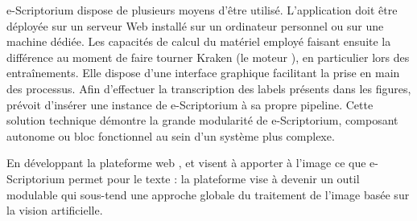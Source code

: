 e-Scriptorium dispose de plusieurs moyens d'être utilisé. L'application doit être déployée sur un serveur Web installé sur un ordinateur personnel ou sur une machine dédiée. Les capacités de calcul du matériel employé faisant ensuite la différence au moment de faire tourner Kraken (le moteur \htr), en particulier lors des entraînements. Elle dispose d'une interface graphique facilitant la prise en main des processus. Afin d'effectuer la transcription des labels présents dans les figures, \eida prévoit d'insérer une instance de e-Scriptorium à sa propre pipeline. Cette solution technique démontre la grande modularité de e-Scriptorium, composant autonome ou bloc fonctionnel au sein d'un système plus complexe.

En développant la plateforme web \aikon, \eida et \vhs visent à apporter à l'image ce que e-Scriptorium permet pour le texte : la plateforme vise à devenir un outil modulable qui sous-tend une approche globale du traitement de l'image basée sur la vision artificielle. 